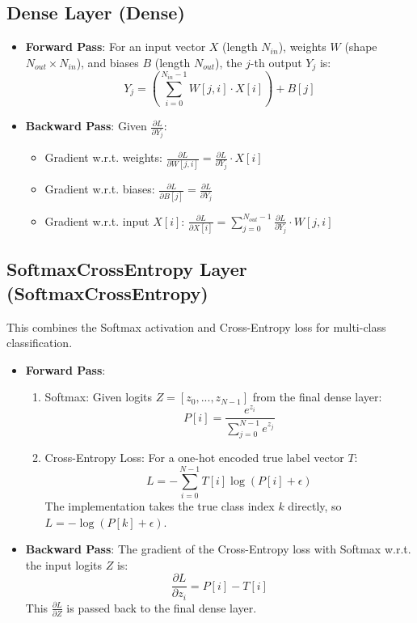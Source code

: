 \documentclass[conference]{IEEEtran}
\begin{document}
\subsection{Dense Layer (Dense)}
\begin{itemize}
    \item \textbf{Forward Pass}: For an input vector $X$ (length $N_{in}$), weights $W$ (shape $N_{out} \times N_{in}$), and biases $B$ (length $N_{out}$), the $j$-th output $Y_j$ is:
    \[ Y_j = \left( \sum_{i=0}^{N_{in}-1} W[j,i] \cdot X[i] \right) + B[j] \]
    \item \textbf{Backward Pass}: Given $\frac{\partial L}{\partial Y_j}$: \\
        \begin{itemize}
            \item Gradient w.r.t. weights: $\frac{\partial L}{\partial W[j,i]} = \frac{\partial L}{\partial Y_j} \cdot X[i]$ \\
            \item Gradient w.r.t. biases: $\frac{\partial L}{\partial B[j]} = \frac{\partial L}{\partial Y_j}$ \\
            \item Gradient w.r.t. input $X[i]$: $\frac{\partial L}{\partial X[i]} = \sum_{j=0}^{N_{out}-1} \frac{\partial L}{\partial Y_j} \cdot W[j,i]$
        \end{itemize}
\end{itemize}

\subsection{SoftmaxCrossEntropy Layer (SoftmaxCrossEntropy)}
This combines the Softmax activation and Cross-Entropy loss for multi-class classification.
\begin{itemize}
    \item \textbf{Forward Pass}:
        \begin{enumerate}
            \item Softmax: Given logits $Z = [z_0, ..., z_{N-1}]$ from the final dense layer:
            \[ P[i] = \frac{e^{z_i}}{\sum_{j=0}^{N-1} e^{z_j}} \]
            \item Cross-Entropy Loss: For a one-hot encoded true label vector $T$:
            \[ L = - \sum_{i=0}^{N-1} T[i] \log(P[i] + \epsilon) \]
            The implementation takes the true class index $k$ directly, so $L = - \log(P[k] + \epsilon)$.
        \end{enumerate}
    \item \textbf{Backward Pass}: The gradient of the Cross-Entropy loss with Softmax w.r.t. the input logits $Z$ is:
    \[ \frac{\partial L}{\partial z_i} = P[i] - T[i] \]
    This $\frac{\partial L}{\partial Z}$ is passed back to the final dense layer.
\end{itemize}
\end{document}
